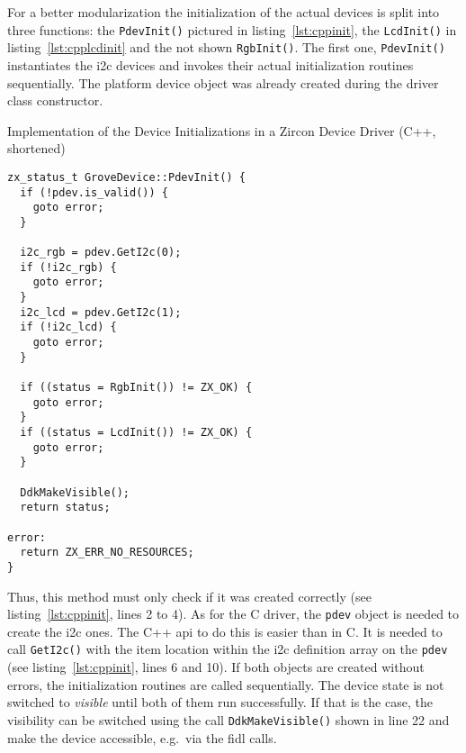 For a better modularization the initialization of the actual devices is split into three functions: the \texttt{PdevInit()} pictured in listing~\ref{lst:cppinit}, the \texttt{LcdInit()} in listing~\ref{lst:cpplcdinit} and the not shown \texttt{RgbInit()}.
The first one, \texttt{PdevInit()} instantiates the \ac{i2c} devices and invokes their actual initialization routines sequentially.
The platform device object was already created during the driver class constructor.
%
\begin{listing} [H]
    \caption{Implementation of the Device Initializations in a Zircon Device Driver (C++, shortened)}
\label{lst:cppinit}
\begin{verbatim}
zx_status_t GroveDevice::PdevInit() {
  if (!pdev.is_valid()) {
    goto error;
  }

  i2c_rgb = pdev.GetI2c(0);
  if (!i2c_rgb) {
    goto error;
  }
  i2c_lcd = pdev.GetI2c(1);
  if (!i2c_lcd) {
    goto error;
  }

  if ((status = RgbInit()) != ZX_OK) {
    goto error;
  }
  if ((status = LcdInit()) != ZX_OK) {
    goto error;
  }

  DdkMakeVisible();
  return status;

error:
  return ZX_ERR_NO_RESOURCES;
}
\end{verbatim}
\end{listing}
%
%
Thus, this method must only check if it was created correctly (see listing~\ref{lst:cppinit}, lines 2 to 4).
As for the C driver, the \texttt{pdev} object is needed to create the \ac{i2c} ones.
The C++ \ac{api} to do this is easier than in C.
It is needed to call \texttt{GetI2c()} with the item location within the \ac{i2c} definition array on the \texttt{pdev} (see listing~\ref{lst:cppinit}, lines 6 and 10).
If both objects are created without errors, the initialization routines are called sequentially.
The device state is not switched to \textit{visible} until both of them run successfully.
If that is the case, the visibility can be switched using the call \texttt{DdkMakeVisible()} shown in line 22 and make the device accessible, e.g.\ via the \ac{fidl} calls.

